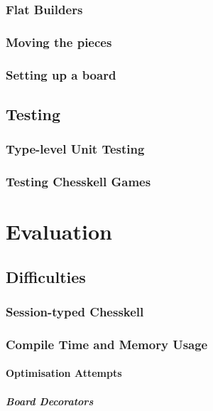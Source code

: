 \documentclass[12pt, a4paper, bibliography=totocnumbered]{scrreprt}
\begin{document}
\section{Flat Builders}

\section{Moving the pieces}

\section{Setting up a board}

\chapter{Testing}

\section{Type-level Unit Testing}

\section{Testing Chesskell Games}


\part{Evaluation}

\chapter{Difficulties}

\section{Session-typed Chesskell}

\section{Compile Time and Memory Usage}

\subsection{Optimisation Attempts}

\subsubsection{Board Decorators}
\end{document}
